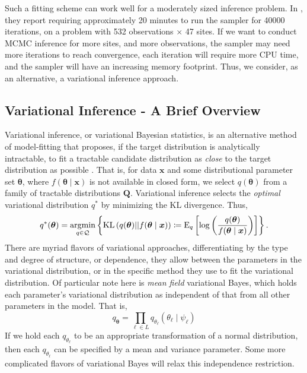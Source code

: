Such a fitting scheme can work well for a moderately sized inference problem.  In \cite{trubey:pg},
    they report requiring approximately \num{20} minutes to run the sampler for \num{40000} iterations, 
    on a problem with \num{532} observations $\times$ \num{47} sites.  If we want to conduct
    MCMC inference for more sites, and more observations, the sampler may need more iterations to
    reach convergence, each iteration will require more CPU time, and the sampler will have an 
    increasing memory footprint. Thus, we consider, as an alternative, a variational inference approach.

\subsection{Variational Inference - A Brief Overview\label{sec:varbayes}}
Variational inference, or variational Bayesian statistics, is an alternative method of 
    model-fitting that proposes, if the target distribution is analytically intractable,
    to fit a tractable candidate distribution as \emph{close} to the target distribution
    as possible \citep{blei2017}. That is, for data $\bm{x}$ and some 
    distributional parameter set $\bm{\theta}$, where $f(\bm{\theta}\mid \bm{x})$ is not 
    available in closed form, we select $q(\bm{\theta})$ from a family of tractable distributions
    $\bm{Q}$.  Variational inference selects the \emph{optimal} variational distribution $q^*$
    by minimizing the KL divergence.  Thus,
    \begin{equation}
        \label{eqn:optimalq}
        q^*(\bm{\theta}) = \operatorname*{argmin}_{q\in\mathcal{Q}}\left\lbrace
        \text{KL}\left(q(\bm{\theta})||f(\bm{\theta}\mid\bm{x})\right) 
        \coloneqq
        \text{E}_{q}\left[\log\left(
        \frac{q(\bm{\theta})}{f(\bm{\theta}\mid\bm{x})}
        \right)\right]
        \right\rbrace.
    \end{equation}
    There are myriad flavors of variational approaches, differentiating by
    the type and degree of structure, or dependence, they allow between the parameters in
    the variational distribution, or in the specific method they use to fit the variational
    distribution.  Of particular note here is \emph{mean field} variational Bayes, which 
    holds each parameter's variational distribution as independent of that from all other 
    parameters in the model.  That is,
    \[
        q_{\bm{\theta}} = \prod_{\ell \in L}q_{\theta_{\ell}}(\theta_{\ell}\mid\psi_{\ell})
    \]
    If we hold each $q_{\theta_{\ell}}$ to be an appropriate transformation of a normal
    distribution, then each $q_{\theta_{\ell}}$ can be specified by a mean and variance 
    parameter. Some \needcite more complicated flavors of variational Bayes will relax 
    this independence restriction.


